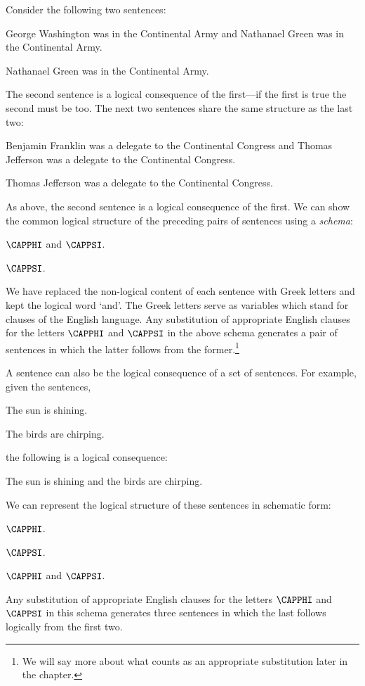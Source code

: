Consider the following two sentences:
\begin{smenumerate}
	\item George Washington was in the Continental Army and Nathanael Green was in the Continental Army.
	\item Nathanael Green was in the Continental Army.
\end{smenumerate}
The second sentence is a logical consequence of the first---if the first is true the second must be too. The next two sentences share the same structure as the last two:
\begin{menumerate}
	\item Benjamin Franklin was a delegate to the Continental Congress and Thomas Jefferson was a delegate to the Continental Congress.
	\item Thomas Jefferson was a delegate to the Continental Congress.
\end{menumerate}
As above, the second sentence is a logical consequence of the first. We can show the common logical structure of the preceding pairs of sentences using a \emph{schema}:
\begin{menumerate}
	\item $\CAPPHI$ and $\CAPPSI$.
	\item $\CAPPSI$.
\end{menumerate}
We have replaced the non-logical content of each sentence with Greek letters and kept the logical word `and'. The Greek letters serve as variables which stand for clauses of the English language. Any substitution of appropriate English clauses for the letters $\CAPPHI$ and $\CAPPSI$ in the above schema generates a pair of sentences in which the latter follows from the former.\footnote{We will say more about what counts as an appropriate substitution later in the chapter.}

A sentence can also be the logical consequence of a set of sentences. For example, given the sentences,
\begin{menumerate}
	\item The sun is shining.
	\item\label{Birds} The birds are chirping.
\end{menumerate}
the following is a logical consequence:
\begin{menumerate}
	\item The sun is shining and the birds are chirping.
\end{menumerate}
We can represent the logical structure of these sentences in schematic form:
\begin{menumerate}
	\item $\CAPPHI$.
	\item $\CAPPSI$.
	\item $\CAPPHI$ and $\CAPPSI$.
\end{menumerate}
Any substitution of appropriate English clauses for the letters $\CAPPHI$ and $\CAPPSI$ in this schema generates three sentences in which the last follows logically from the first two.

